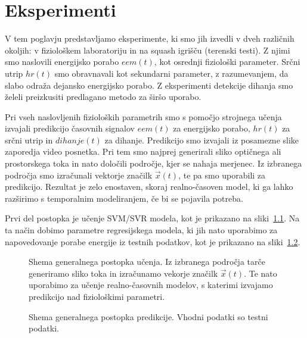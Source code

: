 \chapter{Eksperimenti}\label{sec:eksperimenti}
V tem poglavju predstavljamo eksperimente, ki smo jih izvedli v dveh različnih okoljih: v fiziološkem laboratoriju in na squash igrišču (terenski testi). Z njimi smo naslovili energijsko porabo $eem(t)$, kot osrednji fiziološki parameter. Srčni utrip $hr(t)$ smo obravnavali kot sekundarni parameter, z razumevanjem, da slabo odraža dejansko energijsko porabo. Z eksperimenti detekcije dihanja smo želeli preizkusiti predlagano metodo za širšo uporabo.

Pri vseh naslovljenih fizioloških parametrih smo s pomočjo strojnega učenja izvajali predikcijo časovnih signalov $eem(t)$ za energijsko porabo, $hr(t)$ za srčni utrip in $dihanje(t)$ za dihanje. Predikcijo smo izvajali iz posamezne slike zaporedja video posnetka. Pri tem smo najprej generirali sliko optičnega ali prostorskega toka in nato določili področje, kjer se nahaja merjenec. Iz izbranega področja smo izračunali vektorje značilk $\vec{x}(t)$, te pa smo uporabili za predikcijo. Rezultat je zelo enostaven, skoraj realno-časoven model, ki ga lahko razširimo s temporalnim modeliranjem, če bi se pojavila potreba. 

Prvi del postopka je učenje SVM/SVR modela, kot je prikazano na sliki~\ref{fig:shema-generalnega-postopka01}. Na ta način dobimo parametre regresijskega modela, ki jih nato uporabimo za napovedovanje porabe energije iz testnih podatkov, kot je prikazano na sliki~\ref{fig:shema-generalnega-postopka02}.

\begin{figure}[!htb]
	\centering
	\resizebox{\columnwidth}{!}{}
	\caption[Shema generalnega postopka učenja]{Shema generalnega postopka učenja. Iz izbranega področja tarče generiramo sliko toka in izračunamo vekorje značilk $\vec{x}(t)$. Te nato uporabimo za učenje realno-časovnih modelov, s katerimi izvajamo predikcijo nad fiziološkimi parametri.}
	\label{fig:shema-generalnega-postopka01}
\end{figure}

\begin{figure}[!htb]
	\centering
	\resizebox{\columnwidth}{!}{}
	\caption[Shema generalnega postopka predikcije]{Shema generalnega postopka predikcije. Vhodni podatki so testni podatki.}
	\label{fig:shema-generalnega-postopka02}
\end{figure}

